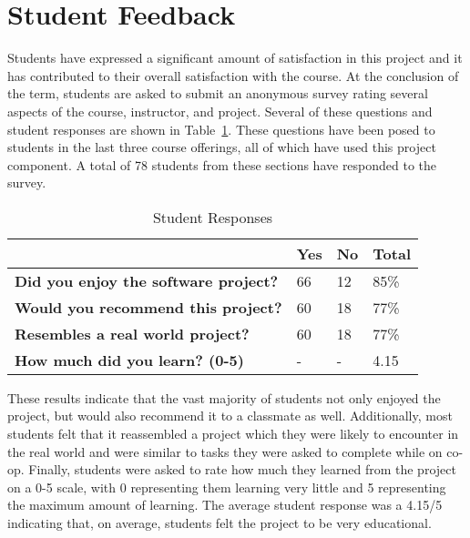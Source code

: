 \documentclass{sig-alternate}
\begin{document}


\section{Student Feedback}
\label{sec: studentfeedback}

Students have expressed a significant amount of satisfaction in this project and it has contributed to their overall satisfaction with the course. At the conclusion of the term, students are asked to submit an anonymous survey rating several aspects of the course, instructor, and project. Several of these questions and student responses are shown in Table~\ref{table:studentfeedback}. These questions have been posed to students in the last three course offerings, all of which have used this project component. A total of 78 students from these sections have responded to the survey.

\begin{table}[h!]
\caption{Student Responses}
\begin{center}
    \begin{tabular}{ l | l | l | l    }
    \toprule

	\bfseries & Yes & \bfseries No & \bfseries Total \\ \hline \hline
	\bfseries Did you enjoy the software project? & 66 & 12 & 85\%  \\ \hline
	\bfseries Would you recommend this project? & 60 & 18 & 77\%  \\ \hline
	\bfseries Resembles a real world project? & 60 & 18 & 77\%  \\ \hline
	\bfseries How much did you learn? (0-5)& - & - & 4.15  \\
 \bottomrule
    \end{tabular}
\end{center}

\label{table:studentfeedback}
\end{table}

These results indicate that the vast majority of students not only enjoyed the project, but would also recommend it to a classmate as well. Additionally, most students felt that it reassembled a project which they were likely to encounter in the real world and were similar to tasks they were asked to complete while on co-op. Finally, students were asked to rate how much they learned from the project on a 0-5 scale, with 0 representing them learning very little and 5 representing the maximum amount of learning. The average student response was a 4.15/5 indicating that, on average, students felt the project to be very educational.
\end{document}
